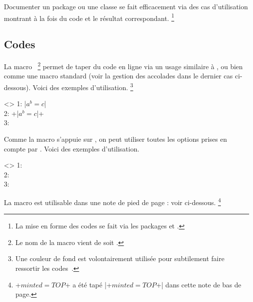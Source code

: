 Documenter un package ou une classe se fait efficacement via des cas d'utilisation montrant à la fois du code et le résultat correspondant.%
\footnote{
    La mise en forme des codes se fait via les packages  et  .
}



\subsection{Codes }
\label{tutodoc-listing-latex-inline}

\begin{tdocexa}
    La macro \,%
    \footnote{
        Le nom de la macro  vient de  soit .
    }
    permet de taper du code en ligne via un usage similaire à , ou bien comme une macro standard (voir la gestion des accolades dans le dernier cas ci-dessous).
    Voici des exemples d'utilisation.%
    \footnote{
    	Une couleur de fond est volontairement utilisée pour subtilement faire ressortir les codes \tdoclatexin{\LaTeX}\,.
    }

    \begin{tdoclatex}<>
1: \tdoclatexin|$a^b = c$|               \\
2: \tdoclatexin+\tdoclatexin|$a^b = c$|+ \\
3: 
	\end{tdoclatex}
\end{tdocexa}


\begin{tdocexa}
    Comme la macro  s'appuie sur , on peut utiliser toutes les options prises en compte par .
    Voici des exemples d'utilisation.

    \begin{tdoclatex}<>
1:              \\
2:  \\
3: 
	\end{tdoclatex}
\end{tdocexa}


\begin{tdocnote}
    La macro  est utilisable dans une note de pied de page : voir ci-dessous.%
    \footnote{
        \tdoclatexin+$minted = TOP$+ a été tapé \tdoclatexin|\tdoclatexin+$minted = TOP$+| dans cette note de bas de page.
    }
\end{tdocnote}



